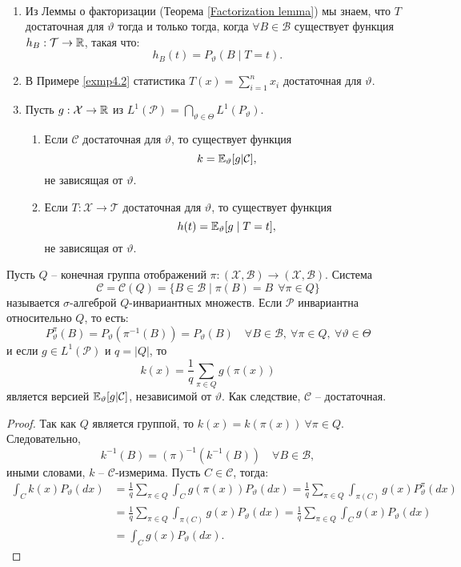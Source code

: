 \begin{rmrk} \
	\begin{enumerate}
		\item Из Леммы о факторизации (Теорема \ref{Factorization lemma}) мы знаем, что $T$ достаточная для $\vartheta$ тогда и только тогда, когда $\forall B \in \mathcal{B}$ существует функция $h_B:\mathcal{T} \rightarrow \mathbb{R}$, такая что:
		\[ h_B(t)=P_\vartheta(B \mid T=t). \]
		\item В Примере \ref{exmp4.2} статистика $T(x)=\sum_{i=1}^{n}x_i$ достаточная для $\vartheta$.
		\item Пусть $g:\mathcal{X} \rightarrow \mathbb{R}$ из $L^1(\mathcal{P}) = \bigcap_{\vartheta \in \Theta}L^1(P_\vartheta)$.
		\begin{enumerate}
			\item Если $\mathcal{C}$ достаточная для $\vartheta$, то существует функция
			\[ k = \mathbb{E}_\vartheta[g | \mathcal{C}], \]
			не зависящая от $\vartheta$.
			\item Если $T: \mathcal{X} \rightarrow \mathcal{T}$ достаточная для $\vartheta$, то существует функция
			\[h(t)=\mathbb{E}_\vartheta[g \mid T=t],\]
			не зависящая от $\vartheta$.
		\end{enumerate}
	\end{enumerate}
\end{rmrk}

\begin{exmp}
	Пусть $Q$ -- конечная группа отображений $\pi: (\mathcal{X}, \mathcal{B}) \rightarrow (\mathcal{X}, \mathcal{B})$. Система
	\[ \mathcal{C}=\mathcal{C}(Q)=\{ B \in \mathcal{B} \mid \pi(B)=B \ \ \forall \pi \in Q \} \]
	называется $\sigma$-алгеброй $Q$-инвариантных множеств. Если $\mathcal{P}$ инвариантна относительно $Q$, то есть:
	\[P_\vartheta^\pi(B)=P_\vartheta(\pi^{-1}(B))=P_\vartheta(B) \quad \forall B \in \mathcal{B},\ \forall \pi \in Q,\ \forall \vartheta \in \Theta\]
	и если $g \in L^1(\mathcal{P})$ и $q=|Q|$, то
	\[ k(x)=\frac{1}{q} \sum_{\pi \in Q} g(\pi(x)) \]
	является версией $\mathbb{E}_\vartheta[g|\mathcal{C}]$, независимой от $\vartheta$. Как следствие, $\mathcal{C}$ -- достаточная.
\end{exmp}
\begin{proof}
	Так как $Q$ является группой, то $k(x)=k(\pi(x)) \ \forall \pi \in Q$. Следовательно, 
	\[ k^{-1}(B)=(\pi)^{-1}(k^{-1}(B)) \quad \forall B \in \mathcal{B}, \]
	иными словами, $k$ -- $\mathcal{C}$-измерима. Пусть $C \in \mathcal{C}$, тогда:
	\[
	\begin{aligned}
	    \int_{C} k(x)P_\vartheta(dx) & =\frac{1}{q}\sum_{\pi \in Q} \int_{C} g(\pi(x)) P_\vartheta(dx)=\frac{1}{q}\sum_{\pi \in Q} \int_{\pi(C)} g(x) P_\vartheta^\pi(dx) \\
	    & = \frac{1}{q}\sum_{\pi \in Q} \int_{\pi(C)} g(x) P_\vartheta(dx) = \frac{1}{q}\sum_{\pi \in Q} \int_{C} g(x) P_\vartheta(dx)\\
	    & = \int_{C} g(x)P_\vartheta(dx).
	\end{aligned}
	 \]
\end{proof}

